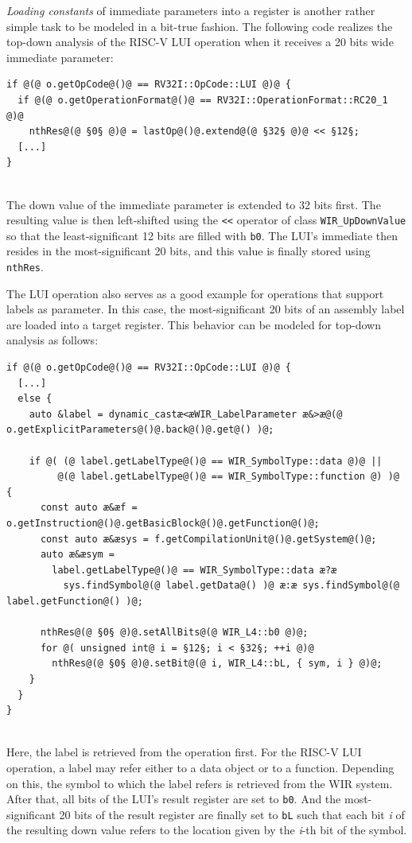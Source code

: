 \begin{enumerate}[resume]
  \emph{Loading constants} of immediate parameters into a register is another rather simple task to be modeled in a bit-true fashion.
  The following code realizes the top-down analysis of the RISC-V LUI operation when it receives a 20 bits wide immediate parameter: \\
\begin{lstlisting}[style=code,float=!h,xleftmargin=10mm,aboveskip=-0.8 \baselineskip,belowskip=-0.8 \baselineskip]
if @(@ o.getOpCode@()@ == RV32I::OpCode::LUI @)@ {
  if @(@ o.getOperationFormat@()@ == RV32I::OperationFormat::RC20_1 @)@
    nthRes@(@ §0§ @)@ = lastOp@()@.extend@(@ §32§ @)@ << §12§;
  [...]
}
\end{lstlisting}
  \\
  The down value of the immediate parameter is extended to 32 bits first.
  The resulting value is then left-shifted using the \texttt{<{}<} operator of class \texttt{WIR\_UpDownValue} so that the least-significant 12 bits are filled with \texttt{b0}.
  The LUI's immediate then resides in the most-significant 20 bits, and this value is finally stored using \texttt{nthRes}.

  The LUI operation also serves as a good example for operations that support labels as parameter.
  In this case, the most-significant 20 bits of an assembly label are loaded into a target register.
  This behavior can be modeled for top-down analysis as follows: \\
\begin{lstlisting}[style=code,float=!h,xleftmargin=10mm,aboveskip=-0.8 \baselineskip,belowskip=-0.8 \baselineskip]
if @(@ o.getOpCode@()@ == RV32I::OpCode::LUI @)@ {
  [...]
  else {
    auto &label = dynamic_castæ<æWIR_LabelParameter æ&>æ@(@ o.getExplicitParameters@()@.back@()@.get@() )@;

    if @( (@ label.getLabelType@()@ == WIR_SymbolType::data @)@ ||
         @(@ label.getLabelType@()@ == WIR_SymbolType::function @) )@ {
      const auto æ&æf = o.getInstruction@()@.getBasicBlock@()@.getFunction@()@;
      const auto æ&æsys = f.getCompilationUnit@()@.getSystem@()@;
      auto æ&æsym =
        label.getLabelType@()@ == WIR_SymbolType::data æ?æ
          sys.findSymbol@(@ label.getData@() )@ æ:æ sys.findSymbol@(@ label.getFunction@() )@;

      nthRes@(@ §0§ @)@.setAllBits@(@ WIR_L4::b0 @)@;
      for @( unsigned int@ i = §12§; i < §32§; ++i @)@
        nthRes@(@ §0§ @)@.setBit@(@ i, WIR_L4::bL, { sym, i } @)@;
    }
  }
}
\end{lstlisting}
  \\
  Here, the label is retrieved from the operation first. For the RISC-V LUI operation, a label may refer either to a data object or to a function.
  Depending on this, the symbol to which the label refers is retrieved from the \gls{WIR} system.
  After that, all bits of the LUI's result register are set to \texttt{b0}.
  And the most-significant 20 bits of the result register are finally set to \texttt{bL} such that each bit \emph{i} of the resulting down value refers to the location given by the \emph{i}-th bit of the symbol.


\end{enumerate}
